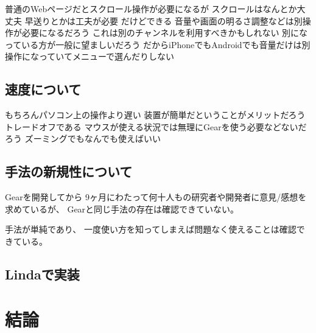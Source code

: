 \documentclass[twoside]{wiss}
\def\GEAR{\textsf{Gear}}
\begin{document}
普通のWebページだとスクロール操作が必要になるが
  スクロールはなんとか大丈夫
  早送りとかは工夫が必要
    だけどできる
音量や画面の明るさ調整などは別操作が必要になるだろう
     これは別のチャンネルを利用すべきかもしれない
     別になっている方が一般に望ましいだろう
       だからiPhoneでもAndroidでも音量だけは別操作になっていてメニューで選んだりしない

\subsection*{速度について}
   もちろんパソコン上の操作より遅い
   装置が簡単だということがメリットだろう
     トレードオフである
   マウスが使える状況では無理に{\GEAR}を使う必要などないだろう
     ズーミングでもなんでも使えばいい

\subsection*{手法の新規性について}

{\GEAR}を開発してから
9ヶ月にわたって何十人もの研究者や開発者に意見/感想を求めているが、
{\GEAR}と同じ手法の存在は確認できていない。

手法が単純であり、
一度使い方を知ってしまえば問題なく使えることは確認できている。

\subsection*{Lindaで実装}

\section{結論}

{\scriptsize


}
\end{document}
